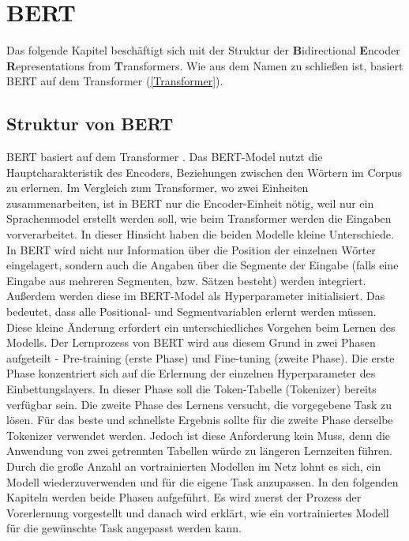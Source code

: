 \chapter{BERT}

Das folgende Kapitel beschäftigt sich mit der Struktur der \textbf{B}idirectional \textbf{E}ncoder \textbf{R}epresentations from \textbf{T}ransformers. Wie aus dem Namen zu schließen ist, basiert BERT auf dem Transformer (\ref{Transformer}).

\section{Struktur von BERT} \label{BERT}

BERT basiert auf dem Transformer \cite{BERT:19}. Das BERT-Model nutzt die Hauptcharakteristik des Encoders, Beziehungen zwischen den Wörtern im Corpus zu erlernen. Im Vergleich zum Transformer, wo zwei Einheiten zusammenarbeiten, ist in BERT nur die Encoder-Einheit nötig, weil nur ein Sprachenmodel erstellt werden soll, wie beim Transformer werden die Eingaben vorverarbeitet. In dieser Hinsicht haben die beiden Modelle kleine Unterschiede. In BERT wird nicht nur Information über die Position der einzelnen Wörter eingelagert, sondern auch die Angaben über die Segmente der Eingabe (falls eine Eingabe aus mehreren Segmenten, bzw. Sätzen besteht) werden integriert. Außerdem werden diese im BERT-Model als Hyperparameter initialisiert. Das bedeutet, dass alle Positional- und Segmentvariablen erlernt werden müssen. Diese kleine Änderung erfordert ein unterschiedliches Vorgehen beim Lernen des Modells. Der Lernprozess von BERT wird aus diesem Grund in zwei Phasen aufgeteilt - Pre-training (erste Phase) und Fine-tuning (zweite Phase). Die erste Phase konzentriert sich auf die Erlernung der einzelnen Hyperparameter des Einbettungslayers. In dieser Phase soll die Token-Tabelle (Tokenizer) bereits verfügbar sein. Die zweite Phase des Lernens versucht, die vorgegebene Task zu lösen. Für das beste und schnellste Ergebnis sollte für die zweite Phase derselbe Tokenizer verwendet werden. Jedoch ist diese Anforderung kein Muss, denn die Anwendung von zwei getrennten Tabellen würde zu längeren Lernzeiten führen. Durch die große Anzahl an vortrainierten Modellen im Netz lohnt es sich, ein Modell wiederzuverwenden und für die eigene Task anzupassen. In den folgenden Kapiteln werden beide Phasen aufgeführt. Es wird zuerst der Prozess der Vorerlernung vorgestellt und danach wird erklärt, wie ein vortrainiertes Modell für die gewünschte Task angepasst werden kann.

